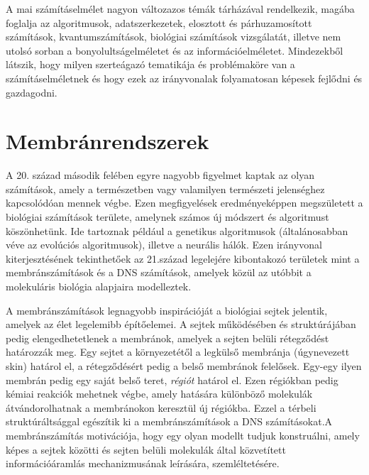 

A mai számításelmélet nagyon változazos témák tárházával rendelkezik, 
magába foglalja az algoritmusok, adatszerkezetek, elosztott és párhuzamosított számítások, kvantumszámítások, biológiai számítások vizsgálatát, illetve nem utolsó sorban a bonyolultságelméletet és az információelméletet.
Mindezekből látszik, hogy milyen szerteágazó tematikája és problémaköre van a számításelméletnek és hogy ezek az irányvonalak folyamatosan képesek fejlődni és gazdagodni.

\section{Membránrendszerek}

A 20. század második felében egyre nagyobb figyelmet kaptak az olyan számítások, amely a természetben vagy valamilyen természeti jelenséghez kapcsolódóan mennek végbe. Ezen megfigyelések eredményeképpen megszületett a biológiai számítások területe, amelynek számos új módszert és algoritmust köszönhetünk. Ide tartoznak például a genetikus algoritmusok (általánosabban véve az evolúciós algoritmusok), illetve a neurális hálók. Ezen irányvonal kiterjesztésének tekinthetőek az 21.század legelejére kibontakozó területek mint a membránszámítások és a DNS számítások, amelyek közül az utóbbit a molekuláris biológia alapjaira modelleztek.

A membránszámítások legnagyobb inspirációját a biológiai sejtek jelentik, amelyek az élet legelemibb építőelemei. A sejtek működésében és struktúrájában pedig elengedhetetlenek a membránok, amelyek a sejten belüli rétegződést határozzák meg. Egy sejtet a környezetétől a legkülső membránja (úgynevezett skin) határol el, a rétegződésért pedig a belső membránok felelősek.  Egy-egy ilyen membrán pedig egy saját belső teret, \textit{régiót} határol el.
Ezen régiókban pedig kémiai reakciók mehetnek végbe, amely hatására különböző molekulák átvándorolhatnak a membránokon keresztül új régiókba. Ezzel a térbeli struktúráltsággal egészítik ki a membránszámítások a DNS számításokat.A  membránszámítás motivációja, hogy egy olyan modellt tudjuk konstruálni, amely képes a sejtek közötti és sejten belüli molekulák által közvetített információáramlás mechanizmusának leírására, szemléltetésére.

